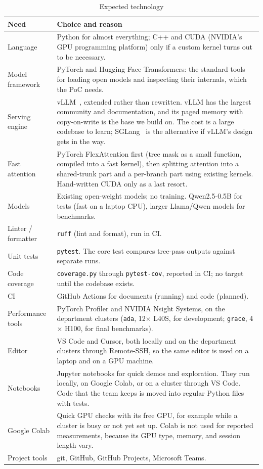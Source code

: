 \documentclass{article}
\begin{document}
\begin{table}[H]
\caption{Expected technology} \label{TblTech}
\begin{tabularx}{\textwidth}{lX}
\toprule
\textbf{Need} & \textbf{Choice and reason}\\
\midrule
Language & Python for almost everything; C++ and CUDA (NVIDIA's GPU programming
platform) only if a custom kernel
turns out to be necessary.\\
Model framework & PyTorch and Hugging Face Transformers: the standard
tools for loading open models and inspecting their internals, which the
PoC needs.\\
Serving engine & vLLM~\cite{Kwon2023vLLM}, extended rather than
rewritten. vLLM has the largest community and documentation, and its paged
memory with copy-on-write is
the base we build on. The cost is a large codebase to learn;
SGLang~\cite{Zheng2024SGLang} is the
alternative if vLLM's design gets in the way.\\
Fast attention & PyTorch FlexAttention first (tree mask as a small
function, compiled into a fast kernel), then splitting attention into a
shared-trunk part and a per-branch part using existing kernels.
Hand-written CUDA only as a last resort.\\
Models & Existing open-weight models; no training. Qwen2.5-0.5B for tests
(fast on a laptop CPU), larger Llama/Qwen models for benchmarks.\\
Linter / formatter & \texttt{ruff} (lint and format), run in CI.\\
Unit tests & \texttt{pytest}. The core test compares tree-pass outputs
against separate runs.\\
Code coverage & \texttt{coverage.py} through \texttt{pytest-cov}, reported
in CI; no target until the codebase exists.\\
CI & GitHub Actions for documents (running) and code (planned).\\
Performance tools & PyTorch Profiler and NVIDIA Nsight Systems, on the
department clusters (\texttt{ada}, 12$\times$ L40S, for development;
\texttt{grace}, 4$\times$ H100, for final benchmarks).\\
Editor & VS Code and Cursor, both locally and on the department clusters
through Remote-SSH, so the same editor is used on a laptop and on a GPU
machine.\\
Notebooks & Jupyter notebooks for quick demos and exploration. They run
locally, on Google Colab, or on a cluster through VS Code. Code that the
team keeps is moved into regular Python files with tests.\\
Google Colab & Quick GPU checks with its free GPU, for example while a
cluster is busy or not yet set up. Colab is not used for reported
measurements, because its GPU type, memory, and session length vary.\\
Project tools & git, GitHub, GitHub Projects, Microsoft Teams.\\
\bottomrule
\end{tabularx}
\end{table}
\end{document}

